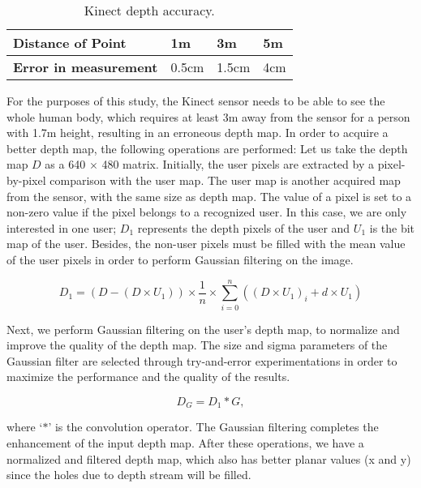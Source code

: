 \begin{table}
\center
\begin{tabular}{ | l | l | l | l |}
\hline
\textbf{Distance of Point} & 1m & 3m & 5m \\ \hline
\textbf{Error in measurement} & 0.5cm & 1.5cm & 4cm \\ 
\hline
\end{tabular}
\caption{Kinect depth accuracy.}
\label{tbl:error_kinect}
\end{table}

For the purposes of this study, the Kinect sensor needs to be able to see the whole human body, which requires at least 3m away from the sensor for a person with 1.7m height, resulting in an erroneous depth map. In order to acquire a better depth map, the following operations are performed: Let us take the depth map $D$ as a 640 $\times$ 480 matrix. Initially, the user pixels are extracted by a pixel-by-pixel comparison with the user map. The user map is another acquired map from the sensor, with the same size as depth map. The value of a pixel is set to a non-zero value if the pixel belongs to a recognized user. In this case, we are only interested in one user; $D_1$ represents the depth pixels of the user and $U_1$ is the bit map of the user. Besides, the non-user pixels must be filled with the mean value of the user pixels in order to perform Gaussian filtering on the image.

\begin{equation}
D_1=(D-(D \times U_1 )) \times \frac{1}{n} \times \sum\limits_{i=0}^n ((D \times U_1 )_i + d \times U_1 )
\label{eqn:patch_depth}
\end{equation}

Next, we perform Gaussian filtering on the user's depth map, to normalize and improve the quality of the depth map. The size and sigma parameters of the Gaussian filter are selected through try-and-error experimentations in order to maximize the performance and the quality of the results. 

\begin{equation}
D_G=D_1*G,
\label{eqn:gaussian_convolution}
\end{equation}

\noindent where `$*$' is the convolution operator. The Gaussian filtering completes the enhancement of the input depth map. 
After these operations, we have a normalized and filtered depth map, which also has better planar values (x and y) since the holes due to depth stream will be filled.

